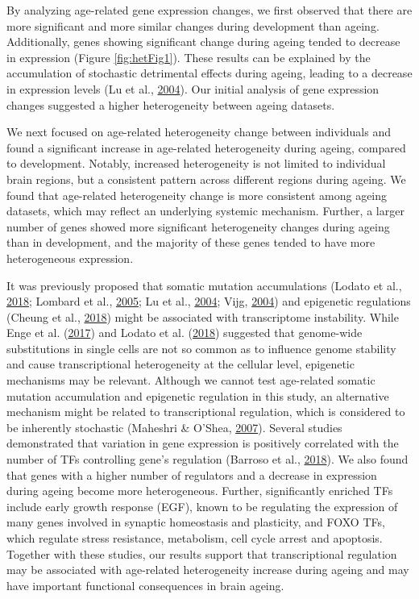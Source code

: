 \documentclass[12pt,twoside]{unicam}
\begin{document}
By analyzing age-related gene expression changes, we first observed that there are more significant and more similar changes during development than ageing. Additionally, genes showing significant change during ageing tended to decrease in expression (Figure \ref{fig:hetFig1}). These results can be explained by the accumulation of stochastic detrimental effects during ageing, leading to a decrease in expression levels (Lu et al., \protect\hyperlink{ref-Lu2004}{2004}). Our initial analysis of gene expression changes suggested a higher heterogeneity between ageing datasets.

We next focused on age-related heterogeneity change between individuals and found a significant increase in age-related heterogeneity during ageing, compared to development. Notably, increased heterogeneity is not limited to individual brain regions, but a consistent pattern across different regions during ageing. We found that age-related heterogeneity change is more consistent among ageing datasets, which may reflect an underlying systemic mechanism. Further, a larger number of genes showed more significant heterogeneity changes during ageing than in development, and the majority of these genes tended to have more heterogeneous expression.

It was previously proposed that somatic mutation accumulations (Lodato et al., \protect\hyperlink{ref-Lodato2018}{2018}; Lombard et al., \protect\hyperlink{ref-Lombard2005}{2005}; Lu et al., \protect\hyperlink{ref-Lu2004}{2004}; Vijg, \protect\hyperlink{ref-Vijg2004}{2004}) and epigenetic regulations (Cheung et al., \protect\hyperlink{ref-Cheung2018}{2018}) might be associated with transcriptome instability. While Enge et al. (\protect\hyperlink{ref-Enge2017}{2017}) and Lodato et al. (\protect\hyperlink{ref-Lodato2018}{2018}) suggested that genome-wide substitutions in single cells are not so common as to influence genome stability and cause transcriptional heterogeneity at the cellular level, epigenetic mechanisms may be relevant. Although we cannot test age-related somatic mutation accumulation and epigenetic regulation in this study, an alternative mechanism might be related to transcriptional regulation, which is considered to be inherently stochastic (Maheshri \& O'Shea, \protect\hyperlink{ref-Maheshri2007}{2007}). Several studies demonstrated that variation in gene expression is positively correlated with the number of TFs controlling gene's regulation (Barroso et al., \protect\hyperlink{ref-Barroso2018}{2018}). We also found that genes with a higher number of regulators and a decrease in expression during ageing become more heterogeneous. Further, significantly enriched TFs include early growth response (EGF), known to be regulating the expression of many genes involved in synaptic homeostasis and plasticity, and FOXO TFs, which regulate stress resistance, metabolism, cell cycle arrest and apoptosis. Together with these studies, our results support that transcriptional regulation may be associated with age-related heterogeneity increase during ageing and may have important functional consequences in brain ageing.
\end{document}
